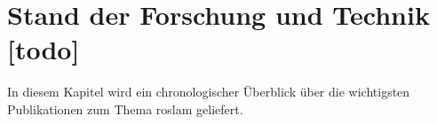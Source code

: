 \begin{comment}
------------------------------------------------------------------------------------------
\end{comment}
\chapter{Stand der Forschung und Technik [todo]}

In diesem Kapitel wird ein chronologischer Überblick über die wichtigsten Publikationen zum Thema \Gls{roslam} geliefert.


\begin{comment}
------------------------------------------------------------------------------------------
- \cite{kantor2002preliminary}
- Preliminary results in range-only localization and mapping (189)
- Section 2
	- Statische Lokalisierung
		- Vorherige Sensorinformationen und Positionsschätzung werden nicht genutzt.
		- Annahme: Position der Beacons ist bekannt und fix.
	- Markovian probability grids
	- Mit fehlerfreien Messungen ist die Positionsbestimmung trivial
	- Entfernungsmessung mit einem erwarteten Fehler von 6 feet, also 1,82 meter. (1Fuß==30cm)
	- 1. Characterizing Range Measurements
		- Erstellen einer Verteilungsfunktion für die Entfernungsmessung
		- experimentel bestimmt
		- Diskrete Messungen in einem Set {0,6,12,...,50}
	- 2. Creating Probability Grids
		- Für jede Zelle des Grid wird die Wahrscheinlichkeit mittels der PDF berechnet.
	- 3. Combine Probability Grids
		- Multiply in a pointwise manner
		- scale the result so that the sum over the squares is one.
		- Aus den kombinierten Ergebnisgrid kann die schätzte Position mittels der gewichteten Durchschnitt der Gridzellen berechnet werden.
		- Covariance Matrix lässt sich auch bestimmen
	- Durchschnittlich geschätzer Fehler lag ab 1,62 feet bei einem geschätzen Entfernungsmess Fehler von 5.82 bis 7.18 feet.
- Section 3
	- Beacon positionen sind bekannt
	- Vorherige Positionsschätzung und Odometry daten werden verwendet.
	- Positionsverfolgung mittels Kalman und Monte Carlo
	- Kalman
		- Initiale Positionsschätzung wie in Section 2, jedoch mit drei Beacons.
		- Approximieren eines ringförmigen Gauß-Verteilung um die geschätzte Position.
		- Füttern eines entsprechenden EKF mit den Parametern
	- Monte Carlo
		- Verwendet die pdf aus Section 2 um die Partikels zu gewichten.
	- Durchschnittliche Geschätzter Fehler
		- EKT: 0,73 feet
		- MC: 0,93 feet
- Section 4
	- Lokalisieren in einer Umgebung mit unsicheren beacon positionen
		- Approximately known, good but not perfect
		- crude measurement or estimate location on blueprint
	- SLAM mit EKF
		- State ist die Robot-- und Beacon--Position
		- Error: init 5.13 feet, end 0.77 feet
\end{comment}
